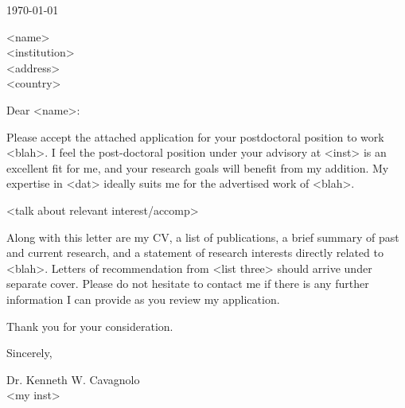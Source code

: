 \documentclass[11pt]{article}
\begin{document}
\today

<name>\\
<institution>\\
<address>\\
<country>

Dear <name>:

Please accept the attached application for your postdoctoral position
to work <blah>. I feel the post-doctoral position under your advisory
at <inst> is an excellent fit for me, and your research goals will
benefit from my addition. My expertise in <dat> ideally suits me for
the advertised work of <blah>.

<talk about relevant interest/accomp>

Along with this letter are my CV, a list of publications, a brief
summary of past and current research, and a statement of research
interests directly related to <blah>. Letters of recommendation from
<list three> should arrive under separate cover. Please do not
hesitate to contact me if there is any further information I can
provide as you review my application.

Thank you for your consideration.

Sincerely,\\
\begin{minipage}{7.5in}
\end{minipage}
Dr. Kenneth W. Cavagnolo\\
<my inst>
\end{document}
